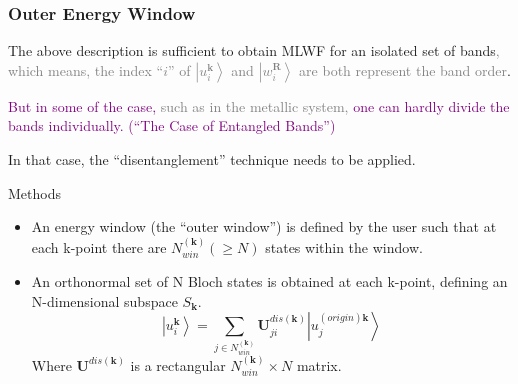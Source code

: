 \documentclass{beamer}
\begin{document}
  \begin{frame}
    \frametitle{Outer Energy Window}
    \small
    The above description is sufficient to obtain MLWF for an isolated set of bands\textcolor{gray}{, which means, the index ``\(i\)'' of \(\left|u_i^{\mathbf{k}}\right\rangle\) and \(\left|w_i^{\mathbf{R}}\right\rangle\) are both represent the band order}.

    \textcolor{purple}{But in some of the case, \textcolor{gray}{such as in the metallic system, } one can hardly divide the bands individually. (``The Case of Entangled Bands'')}
    
    In that case, the ``disentanglement'' technique needs to be applied. 

    \begin{block}{Methods}
      \small
      \begin{itemize}
        \item An energy window (the ``outer window'') is defined by the user such that at each k-point there are \(N_{win}^{(\mathbf{k})} (\geqslant N)\) states within the window. 
        \item An orthonormal set of N Bloch states is obtained at each k-point, defining an N-dimensional subspace \(S_{\mathbf{k}}\).
        \begin{equation}
          \left|u_i^{\mathbf{k}}\right\rangle = \sum_{j\in{N_{win}^{(\mathbf{k})}}}\mathbf{U}_{ji}^{dis(\mathbf{k})}\left|u_j^{(origin)\mathbf{k}}\right\rangle
        \end{equation}
        Where \(\mathbf{U}^{dis(\mathbf{k})}\) is a rectangular \(N_{win}^{(\mathbf{k})}\times{}N\) matrix. 
      \end{itemize}
    \end{block}

  \end{frame}
\end{document}
